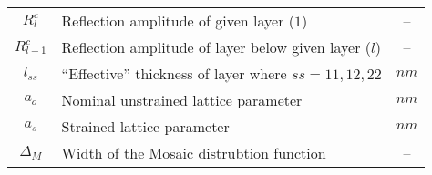 \begin{table}
\begin{longtable}{|c|l|c|}
$R^c_l$         & Reflection amplitude of given layer ($1$) &--\\
$R^c_{l-1}$       & Reflection amplitude of layer below given layer ($l$) & --\\ 
$l_{ss}$        & ``Effective'' thickness of layer where $ss = 11,12,22$ & $nm$\\
$a_o$          & Nominal unstrained lattice parameter & $nm$\\
$a_s$          & Strained lattice parameter  & $nm$ \\
$\Delta_M$ & Width of the Mosaic distrubtion function  & --\\
\hline
\end{longtable}
\end{table}



%	
	
%	
%	
	
